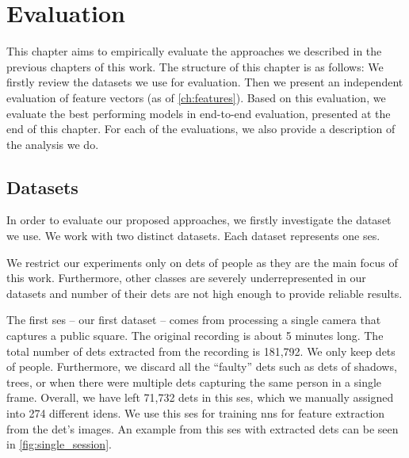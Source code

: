 \chapter{Evaluation}


\label{ch:evaluation}

This chapter aims to empirically evaluate the approaches we described
in the previous chapters of this work. The structure of this chapter is as follows:
We firstly review the datasets we use for evaluation. Then we present an independent
evaluation of feature vectors (as of \autoref{ch:features}). Based on this evaluation, 
we evaluate the best performing models in end-to-end evaluation, presented
at the end of this chapter. For each of the evaluations, we also provide a description of the analysis we do.

\section{Datasets}

\label{sec:datasets}

In order to evaluate our proposed approaches, we firstly investigate the dataset we use. We work with two distinct datasets. Each dataset represents one \gls{ses}.

We restrict our experiments only on \glspl{det} of people as they are the main focus of this work. Furthermore, other classes are severely underrepresented in our datasets and number of their \glspl{det} are not high enough to provide reliable results.

The first \gls{ses} -- our first dataset -- comes from processing a single camera that captures a public square. The original recording is about 5 minutes long. The total number of \glspl{det} extracted from the recording is 181,792. We only keep \glspl{det} of people. Furthermore, we discard all the ``faulty'' \glspl{det} such as \glspl{det} of shadows, trees, or when there were multiple \glspl{det} capturing the same person in a single frame. Overall, we have left 71,732 \glspl{det} in this \gls{ses}, which we manually assigned into 274 different \glspl{iden}. We use this \gls{ses} for training \glspl{nn} for feature extraction from the \gls{det}'s images. An example from this \gls{ses} with extracted \glspl{det} can be seen in \autoref{fig:single_session}.

